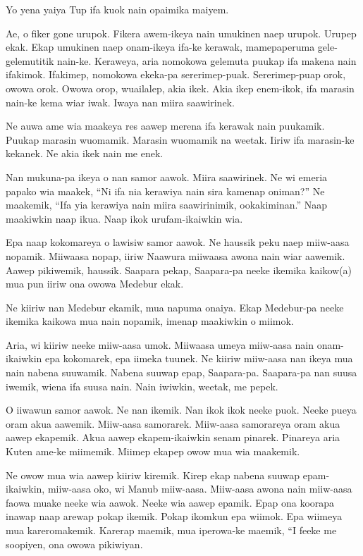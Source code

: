 Yo  yena  yaiya  Tup  ifa  kuok  nain  opaimika     maiyem. 

Ae,  o  fiker  gone  urupok. 
Fikera  awem-ikeya  nain  umukinen  naep  urupok. 
Urupep  ekak. 
Ekap  umukinen  naep onam-ikeya  ifa-ke  kerawak,  mamepaperuma gele-gelemutitik  nain-ke. 
Keraweya,  aria  nomokowa  gelemuta  puukap  ifa  makena  nain  ifakimok. 
Ifakimep,  nomokowa  ekeka-pa  sererimep-puak. 
Sererimep-puap  orok,  owowa  orok. 
Owowa  orop,  wuailalep,  akia  ikek. 
Akia  ikep  enem-ikok,  ifa  marasin  nain-ke kema  wiar  iwak. 
Iwaya  nan  miira  saawirinek.

Ne  auwa  ame  wia  maakeya  res  aawep  merena  ifa  kerawak  nain  puukamik. 
Puukap  marasin  wuomamik. 
Marasin  wuomamik  na  weetak. 
Iiriw  ifa  marasin-ke  kekanek.
Ne  akia  ikek  nain  me  enek.

Nan  mukuna-pa  ikeya  o  nan  samor  aawok. 
Miira  saawirinek. 
Ne  wi  emeria  papako  wia  maakek,  “Ni  ifa nia  kerawiya  nain  sira  kamenap  oniman?” 
Ne  maakemik,  “Ifa  yia  kerawiya  nain  miira  saawirinimik,  ookakiminan.” 
Naap  maakiwkin  naap  ikua. 
Naap  ikok  urufam-ikaiwkin  wia.

Epa  naap  kokomareya  o  lawisiw  samor aawok. 
Ne  haussik  peku  naep  miiw-aasa  nopamik. 
Miiwaasa  nopap,  iiriw  Naawura  miiwaasa  awona  nain     wiar  aawemik. 
Aawep  pikiwemik,  haussik. 
Saapara  pekap,  Saapara-pa  neeke  ikemika  kaikow(a) mua  pun  iiriw  ona  owowa  Medebur  ekak.

Ne  kiiriw  nan  Medebur  ekamik,  mua  napuma  onaiya. 
Ekap  Medebur-pa  neeke  ikemika  kaikowa  mua  nain  nopamik,  imenap  maakiwkin  o  miimok.

Aria,  wi  kiiriw  neeke  miiw-aasa  umok. 
Miiwaasa  umeya  miiw-aasa  nain  onam-ikaiwkin  epa  kokomarek,  epa  iimeka  tuunek. 
Ne  kiiriw  miiw-aasa  nan  ikeya  mua  nain  nabena          suuwamik. 
Nabena  suuwap  epap,  Saapara-pa. 
Saapara-pa  nan  suusa  iwemik,  wiena  ifa  suusa  nain. 
Nain  iwiwkin,  weetak,  me  pepek.

O  iiwawun  samor  aawok.
Ne  nan  ikemik. 
Nan  ikok  ikok  neeke  puok. 
Neeke  pueya  oram  akua  aawemik. 
Miiw-aasa  samorarek. 
Miiw-aasa  samorareya  oram  akua  aawep  ekapemik. 
Akua  aawep  ekapem-ikaiwkin  senam  pinarek. 
Pinareya  aria  Kuten  ame-ke  miimemik. 
Miimep  ekapep  owow  mua  wia  maakemik.

Ne  owow  mua  wia  aawep  kiiriw  kiremik. 
Kirep  ekap  nabena  suuwap  epam-ikaiwkin,  miiw-aasa  oko,  wi  Manub  miiw-aasa. 
Miiw-aasa  awona  nain  miiw-aasa  faowa  muake  neeke   wia  aawok. 
Neeke  wia  aawep  epamik. 
Epap  ona  koorapa  inawap  naap  arewap  pokap  ikemik. 
Pokap  ikomkun  epa  wiimok. 
Epa  wiimeya  mua  kareromakemik. 
Karerap  maemik,  mua  iperowa-ke  maemik,  “I feeke  me  soopiyen,  ona  owowa  pikiwiyan.

